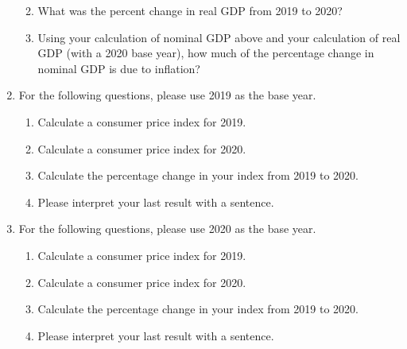 \documentclass{assignment}
\begin{document}
\begin{enumerate}
\begin{enumerate}
\vfill

\vspace{-2\baselineskip}
\clearpage

\item What was the percent change in real GDP from 2019 to 2020?

\vfill

\item Using your calculation of nominal GDP above and your calculation of real GDP (with a 2020 base year), how much of the percentage change in nominal GDP is due to inflation?

\vfill

\end{enumerate}

\item For the following questions, please use 2019 as the base year.

\begin{enumerate}

\item Calculate a consumer price index for 2019.

\vfill

\item Calculate a consumer price index for 2020.

\vfill

\item Calculate the percentage change in your index from 2019 to 2020.

\vfill

\item Please interpret your last result with a sentence.

\vfill

\vspace{-2\baselineskip}

\end{enumerate}

\clearpage

\item For the following questions, please use 2020 as the base year.

\begin{enumerate}

\item Calculate a consumer price index for 2019.

\vfill

\item Calculate a consumer price index for 2020.

\vfill

\item Calculate the percentage change in your index from 2019 to 2020.

\vfill

\item Please interpret your last result with a sentence.

\vfill

\end{enumerate}

\end{enumerate}
\end{document}
